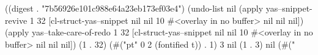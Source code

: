 
((digest . "7b56926e101c988e64a23eb173ef03e4") (undo-list nil (apply yas--snippet-revive 1 32 [cl-struct-yas--snippet nil nil 10 #<overlay in no buffer> nil nil nil]) (apply yas--take-care-of-redo 1 32 [cl-struct-yas--snippet nil nil 10 #<overlay in no buffer> nil nil nil]) (1 . 32) (#("pt" 0 2 (fontified t)) . 1) 3 nil (1 . 3) nil (#("%
